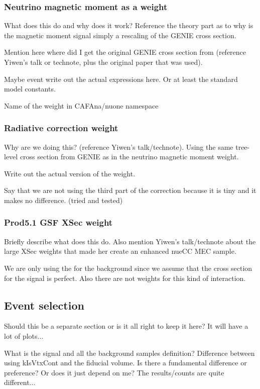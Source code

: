 \documentclass[12pt]{article}
\begin{document}
\subsubsection*{Neutrino magnetic moment as a weight}
What does this do and why does it work? Reference the theory part as to why is the magnetic moment signal simply a rescaling of the GENIE cross section.

Mention here where did I get the original GENIE cross section from (reference Yiwen's talk or technote, plus the original paper that was used).

Maybe event write out the actual expressions here. Or at least the standard model constants.

Name of the weight in CAFAna/nuone namespace

\subsubsection*{Radiative correction weight}
Why are we doing this? (reference Yiwen's talk/technote). Using the same tree-level cross section from GENIE as in the neutrino magnetic moment weight.

Write out the actual version of the weight.

Say that we are not using the third part of the correction because it is tiny and it makes no difference. (tried and tested)

\subsubsection*{Prod5.1 GSF XSec weight}
Briefly describe what does this do. Also mention Yiwen's talk/technote about the large XSec weights that made her create an enhanced nueCC MEC sample.

We are only using the for the background since we assume that the cross section for the signal is perfect. Also there are not weights for this kind of interaction.

\subsection{Event selection}
Should this be a separate section or is it all right to keep it here? It will have a lot of plots...

What is the signal and all the background samples definition? Difference between using kIsVtxCont and the fiducial volume. Is there a fundamental difference or preference? Or does it just depend on me? The results/counts are quite different...
\end{document}
